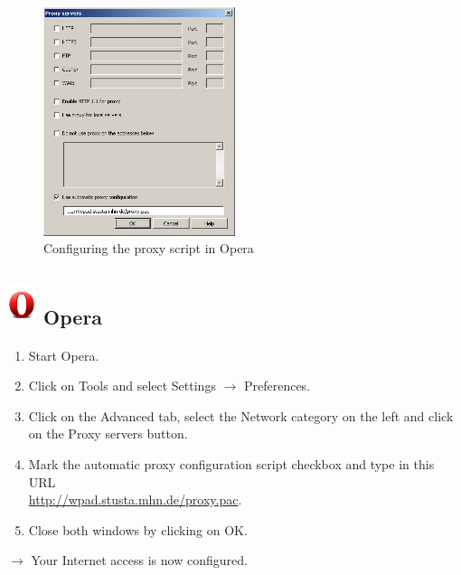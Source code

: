 \documentclass[a4paper,12pt]{scrartcl}
\begin{document}
\newpage
\begin{figure}
  \begin{center}
    \includegraphics[width=0.5\textwidth,keepaspectratio]{Bilder/Proxy_Opera_EN}
  \end{center}
  \caption{Configuring the proxy script in Opera}
\end{figure}

\subsection*{\includegraphics[height=1.2cm,keepaspectratio]{Bilder/Opera_O} Opera}
\begin{enumerate}
    \item Start Opera.
    \item Click on Tools and select Settings $\rightarrow$ Preferences.
    \item Click on the Advanced tab, select the Network category on the left and click on the Proxy servers button.
    \item Mark the automatic proxy configuration script checkbox and type in this URL \\ \url{http://wpad.stusta.mhn.de/proxy.pac}.
    \item Close both windows by clicking on OK.
\end{enumerate}
$\rightarrow$ Your Internet access is now configured.
\end{document}
